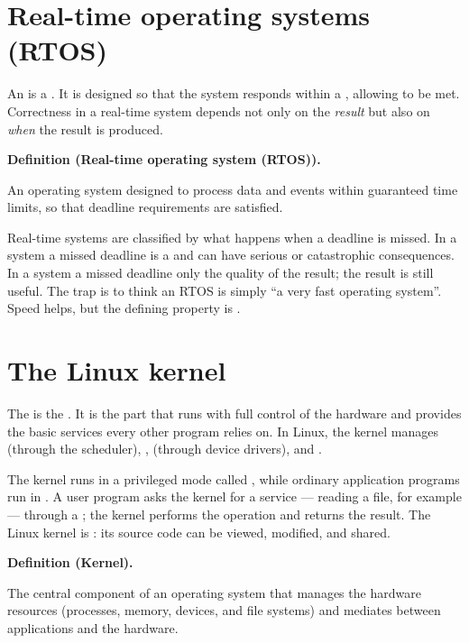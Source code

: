 \documentclass[11pt]{article}
\newenvironment{definitionbox}[1]{%
  \par\noindent\textbf{Definition (#1).}\ \itshape
}{\par\vspace{0.3em}}
\begin{document}
\section{Real-time operating systems (RTOS)}
An  is a . It is designed so that
the system responds within a , allowing  to be
met. Correctness in a real-time system depends not only on the \emph{result}
but also on \emph{when} the result is produced.

\begin{definitionbox}{Real-time operating system (RTOS)}
An operating system designed to process data and events within guaranteed
time limits, so that deadline requirements are satisfied.
\end{definitionbox}

Real-time systems are classified by what happens when a deadline is missed. In
a  system a missed deadline is a  and can have
serious or catastrophic consequences. In a  system a
missed deadline only  the quality of the result; the result is
still useful. The trap is to think an RTOS is simply ``a very fast operating
system''. Speed helps, but the defining property is .

\section{The Linux kernel}
The  is the . It is the part
that runs with full control of the hardware and provides the basic services
every other program relies on. In Linux, the kernel manages
 (through the scheduler), ,  (through
device drivers), and .

The kernel runs in a privileged mode called , while ordinary
application programs run in . A user program asks the kernel
for a service --- reading a file, for example --- through a ;
the kernel performs the operation and returns the result. The Linux kernel is
: its source code can be viewed, modified, and shared.

\begin{definitionbox}{Kernel}
The central component of an operating system that manages the hardware
resources (processes, memory, devices, and file systems) and mediates between
applications and the hardware.
\end{definitionbox}
\end{document}

